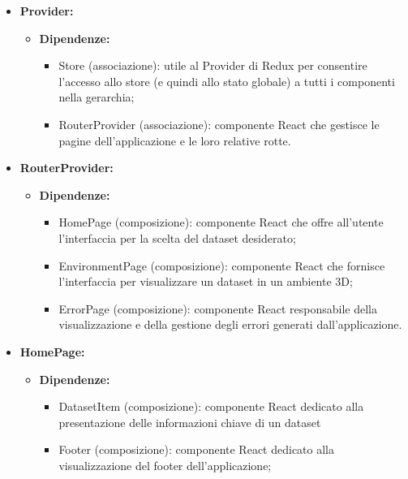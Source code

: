 \begin{itemize}
    \item \textbf{Provider:}
    \begin{itemize}
        \item \textbf{Dipendenze:}
        \begin{itemize}
            \item Store (associazione): utile al Provider di Redux per consentire l'accesso allo store (e quindi allo stato globale) a tutti i componenti nella gerarchia;
            \item RouterProvider (associazione): componente React che gestisce le pagine dell'applicazione e le loro relative rotte.
        \end{itemize} 
    \end{itemize}

    \item \textbf{RouterProvider:}
    \begin{itemize}
        \item \textbf{Dipendenze:}
        \begin{itemize}
            \item HomePage (composizione): componente React che offre all'utente l'interfaccia per la scelta del dataset desiderato;
            \item EnvironmentPage (composizione): componente React che fornisce l'interfaccia per visualizzare un dataset in un ambiente 3D;
            \item ErrorPage (composizione): componente React responsabile della visualizzazione e della gestione degli errori generati dall'applicazione.
        \end{itemize} 
    \end{itemize}

    \item \textbf{HomePage:}
    \begin{itemize}
        \item \textbf{Dipendenze:}
        \begin{itemize}
            \item DatasetItem (composizione): componente React dedicato alla presentazione delle informazioni chiave di un dataset
            \item Footer (composizione): componente React dedicato alla visualizzazione del footer dell'applicazione;
        \end{itemize} 
    \end{itemize}
\end{itemize}


